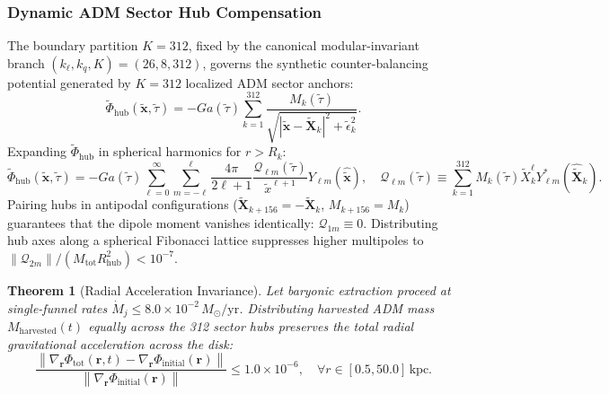 \documentclass[11pt,onecolumn]{article}
\newtheorem{theorem}{Theorem}
\begin{document}
\subsubsection{Dynamic ADM Sector Hub Compensation}
The boundary partition $K = 312$, fixed by the canonical modular-invariant branch $(k_\ell, k_q, K) = (26, 8, 312)$, governs the synthetic counter-balancing potential generated by $K = 312$ localized ADM sector anchors:
\begin{equation}
\tilde{\Phi}_{\mathrm{hub}}(\mathbf{\tilde{x}}, \tilde{\tau}) = -G a(\tilde{\tau}) \sum_{k=1}^{312} \frac{M_k(\tilde{\tau})}{\sqrt{|\mathbf{\tilde{x}} - \mathbf{\tilde{X}}_k|^2 + \tilde{\epsilon}_k^2}}.
\label{eq:hub_potential_def}
\end{equation}
Expanding $\tilde{\Phi}_{\mathrm{hub}}$ in spherical harmonics for $r > R_k$:
\begin{equation}
\tilde{\Phi}_{\mathrm{hub}}(\mathbf{\tilde{x}}, \tilde{\tau}) = -G a(\tilde{\tau}) \sum_{\ell=0}^{\infty} \sum_{m=-\ell}^{\ell} \frac{4\pi}{2\ell+1} \frac{\mathcal{Q}_{\ell m}(\tilde{\tau})}{\tilde{x}^{\ell+1}} Y_{\ell m}(\hat{\mathbf{\tilde{x}}}), \quad
\mathcal{Q}_{\ell m}(\tilde{\tau}) \equiv \sum_{k=1}^{312} M_k(\tilde{\tau}) \tilde{X}_k^\ell Y_{\ell m}^*(\hat{\mathbf{\tilde{X}}}_k).
\end{equation}
Pairing hubs in antipodal configurations ($\mathbf{\tilde{X}}_{k+156} = -\mathbf{\tilde{X}}_k$, $M_{k+156} = M_k$) guarantees that the dipole moment vanishes identically: $\mathcal{Q}_{1m} \equiv 0$. Distributing hub axes along a spherical Fibonacci lattice suppresses higher multipoles to $\|\mathcal{Q}_{2m}\| / (M_{\mathrm{tot}} R_{\mathrm{hub}}^2) < 10^{-7}$.

\begin{theorem}[Radial Acceleration Invariance]
\label{thm:acceleration_invariance}
Let baryonic extraction proceed at single-funnel rates $\dot{M}_j \le 8.0 \times 10^{-2}\,M_\odot/\mathrm{yr}$. Distributing harvested ADM mass $M_{\mathrm{harvested}}(t)$ equally across the 312 sector hubs preserves the total radial gravitational acceleration across the disk:
\begin{equation}
\frac{\left\| \nabla_{\mathbf{r}} \Phi_{\mathrm{tot}}(\mathbf{r}, t) - \nabla_{\mathbf{r}} \Phi_{\mathrm{initial}}(\mathbf{r}) \right\|}{\left\| \nabla_{\mathbf{r}} \Phi_{\mathrm{initial}}(\mathbf{r}) \right\|} \le 1.0 \times 10^{-6}, \quad \forall r \in [0.5, 50.0]\,\mathrm{kpc}.
\end{equation}
\end{theorem}
\end{document}

